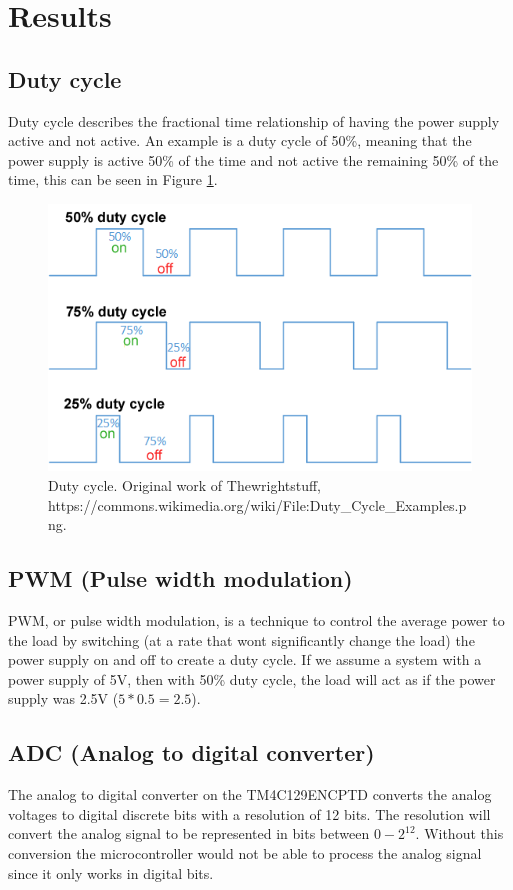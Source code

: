 \section{Results}
\label{section:results}

\subsection{Duty cycle}
Duty cycle describes the fractional time relationship of having the power supply active and not active. An example is a duty cycle of 50\%, meaning that the power supply is active 50\% of the time and not active the remaining 50\% of the time, this can be seen in Figure \ref{fig:duty_cycle}.

\begin{figure}[ht]
    \centering
    \includegraphics[width=0.9\columnwidth]{images/Duty_Cycle_Examples.png}
    \caption{Duty cycle. Original work of Thewrightstuff, https://commons.wikimedia.org/wiki/File:Duty\_Cycle\_Examples.png.}
    \label{fig:duty_cycle}
\end{figure}

\subsection{PWM (Pulse width modulation)}
PWM, or pulse width modulation, is a technique to control the average power to the load by switching (at a rate that wont significantly change the load) the power supply on and off to create a duty cycle. If we assume a system with a power supply of 5V, then with 50\% duty cycle, the load will act as if the power supply was 2.5V ($5*0.5=2.5$).

\subsection{ADC (Analog to digital converter)}

The analog to digital converter on the TM4C129ENCPTD converts the analog voltages to digital discrete bits with a resolution of 12 bits. The resolution will convert the analog signal to be represented in bits between $0-2^{12}$. Without this conversion the microcontroller would not be able to process the analog signal since it only works in digital bits.

